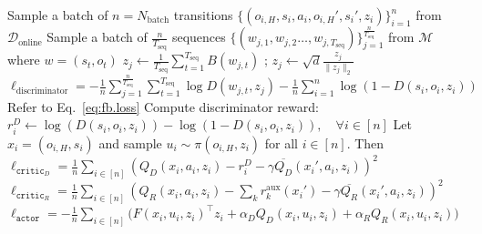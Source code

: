 \begin{algorithm}[h!]
\begin{footnotesize}
\begin{algorithmic}[1]
            \State Sample a batch of $n=N_{\mathrm{batch}}$ transitions $\{({o}_{i,H}, {s}_i, {a}_i, {o}_{i,H}', {s}_i', {z}_i)\}_{i=1}^{n}$ from $\mathcal{D}_{\mathrm{online}}$
            \State Sample a batch of $\frac{n}{T_{\mathrm{seq}} }$ sequences $\{(w_{j, 1}, w_{j, 2} \ldots, w_{j, T_{\mathrm{seq}}}) \}_{j=1}^{\frac{n}{T_{\mathrm{seq}} }}$ from $\mathcal{M}$ where $w = ({s}_t, {o}_t)$
            \State $z_j \leftarrow \frac{1}{T_{\mathrm{seq}}} \sum_{t = 1}^{T_{\mathrm{seq}}} B(w_{j, t}) $ ; $z_j \leftarrow \sqrt{d} \frac{z_j}{\| z_j\|_2} $
            \State $\ell_{\mathrm{discriminator}} = - \frac{1}{n} \sum_{j = 1}^{\frac{n}{T_{\mathrm{seq}} }} \sum_{t = 1}^{T_{\mathrm{seq}}} \log D({w}_{j,t}, {z}_j) - \frac{1}{n} \sum_{i=1}^n \log (1-D({s}_i, {o}_i,{z}_i))$
            \State Refer to Eq.~\ref{eq:fb.loss}
            \State Compute discriminator reward: $r_i^D \leftarrow \log (D({s}_i,{o}_i,  {z}_i)) - \log (1-D({s}_i,{o}_i,  {z}_i)), \quad \forall i \in [n]$
            \State Let $x_i = (o_{i,H}, s_i)$ and sample ${u}_i \sim \pi({o}_{i,H},{z}_i)$ for all $i\in[n]$. Then
	        \State $\ell_{\texttt{critic}_D} =\frac{1}{n} \sum_{i\in[n]} \left( Q_{D}(x_i,{a}_i,{z}_i) - r_i^D - \gamma \overline{Q_D}(x_i',{a}_i,{z}_i) \right)^2$
	        \State $\ell_{\texttt{critic}_R} =\frac{1}{n} \sum_{i\in[n]} \left( Q_{R}(x_i,{a}_i,{z}_i) - \sum_k r^{\mathrm{aux}}_k (x_i') - \gamma \overline{Q_R}(x_i',{a}_i,{z}_i) \right)^2$
            \State $\ell_{\texttt{actor}} = -\frac{1}{n} \sum_{i\in[n]}\Big( F(x_i,{u}_i,{z}_i)^\top {z}_i  + \alpha_D Q_D(x_i,{u}_i,{z}_i) + \alpha_R Q_R(x_i,{u}_i,{z}_i)\Big)$
        \EndFor
    \EndFor
	\end{algorithmic}
 \end{footnotesize}
	\end{algorithm}

